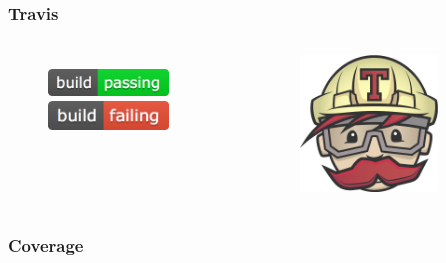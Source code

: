\documentclass{beamer}
\begin{document}
\begin{frame}
\frametitle{Travis}
\begin{columns}[c]
\begin{figure}[width=\colwidth]
    \vfill
    \includegraphics[width=0.8\textwidth]{travispass}
    \vspace{10mm}
    \includegraphics[width=0.8\textwidth]{travisfail}
    \vfill
\end{figure}
\begin{figure}[width=\textwidth]
    \includegraphics[width=0.8\textwidth]{traviscilogo}
\end{figure}
\end{columns}
\end{frame}


\begin{frame}[fragile]
\frametitle{Coverage}
\fontsize{10pt}{10pt} \inputminted{python}{coverage.txt}
\end{frame}
\end{document}
